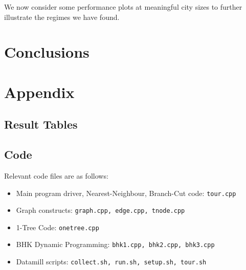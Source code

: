 \documentclass[11pt]{article}
\begin{document}
	We now consider some performance plots at meaningful city sizes to further illustrate the regimes we have found.
	
	\section{Conclusions}
	\label{sec:conclusions}
	
	
	\nocite{*}
	
	
	
	\section*{Appendix}
	\subsection*{Result Tables}
	\subsection*{Code}
	Relevant code files are as follows:
	
	\begin{itemize}
		\item Main program driver, Nearest-Neighbour, Branch-Cut code: \texttt{tour.cpp}
		\item Graph constructs: \texttt{graph.cpp, edge.cpp, tnode.cpp}
		\item 1-Tree Code: \texttt{onetree.cpp}
		\item BHK Dynamic Programming: \texttt{bhk1.cpp, bhk2.cpp, bhk3.cpp}
		\item Datamill scripts: \texttt{collect.sh, run.sh, setup.sh, tour.sh}
	\end{itemize}
	
	
	
\end{document}
